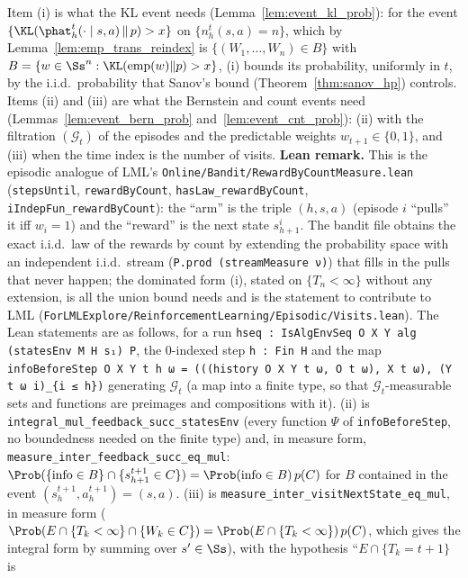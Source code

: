 \begin{remark}\label{rem:pmdp_visits_iid}
Item (i) is what the KL event needs (Lemma~\ref{lem:event_kl_prob}): for the event
$\{\KL(\phat^t_h(\cdot\mid s,a)\,\|\,p) > x\}$ on $\{n^t_h(s,a) = n\}$, which by
Lemma~\ref{lem:emp_trans_reindex} is $\{(W_1,\dots,W_n) \in B\}$ with
$B = \{w \in \Ss^n : \KL(\mathrm{emp}(w)\|p) > x\}$, (i) bounds its probability, uniformly in
$t$, by the i.i.d.\ probability that Sanov's bound (Theorem~\ref{thm:sanov_hp}) controls.
Items (ii) and (iii) are what the Bernstein and count events need
(Lemmas~\ref{lem:event_bern_prob} and~\ref{lem:event_cnt_prob}): (ii) with the filtration
$(\mathcal G_t)$ of the episodes and the predictable weights $w_{t+1} \in \{0, 1\}$, and (iii)
when the time index is the number of visits. \textbf{Lean remark.} This is the episodic
analogue of LML's \texttt{Online/Bandit/RewardByCountMeasure.lean}
(\texttt{stepsUntil}, \texttt{rewardByCount}, \texttt{hasLaw\_rewardByCount},
\texttt{iIndepFun\_rewardByCount}): the ``arm'' is the triple $(h, s, a)$ (episode $i$ ``pulls''
it iff $w_i = 1$) and the ``reward'' is the next state $s^i_{h+1}$. The bandit file obtains the
exact i.i.d.\ law of the rewards by count by extending the probability space with an
independent i.i.d.\ stream (\texttt{P.prod (streamMeasure ν)}) that fills in the pulls that never
happen; the dominated form (i), stated on $\{T_n < \infty\}$ without any extension, is all the
union bound needs and is the statement to contribute to LML (\texttt{ForLMLExplore/ReinforcementLearning/Episodic/Visits.lean}). The Lean
statements are as follows, for a run \texttt{hseq : IsAlgEnvSeq O X Y alg (statesEnv M H s₁) P}, the
$0$-indexed step \texttt{h : Fin H} and the map
\texttt{infoBeforeStep O X Y t h ω = (((history O X Y t ω, O t ω), X t ω), (Y t ω i)\_\{i ≤ h\})}
generating $\mathcal G_t$ (a map into a finite type, so that $\mathcal G_t$-measurable sets and
functions are preimages and compositions with it).
(ii) is \texttt{integral\_mul\_feedback\_succ\_statesEnv} (every function $\Psi$ of
\texttt{infoBeforeStep}, no boundedness needed on the finite type) and, in measure form,
\texttt{measure\_inter\_feedback\_succ\_eq\_mul}: $\Prob(\{\mathrm{info} \in B\} \cap \{s^{t+1}_{h+1} \in C\})
= \Prob(\mathrm{info} \in B)\,p(C)$ for $B$ contained in the event $(s^{t+1}_h, a^{t+1}_h) = (s, a)$.
(iii) is \texttt{measure\_inter\_visitNextState\_eq\_mul}, in measure form
($\Prob(E \cap \{T_k < \infty\} \cap \{W_k \in C\}) = \Prob(E \cap \{T_k < \infty\})\,p(C)$, which gives
the integral form by summing over $s' \in \Ss$), with the hypothesis ``$E \cap \{T_k = t + 1\}$ is

\end{remark}
